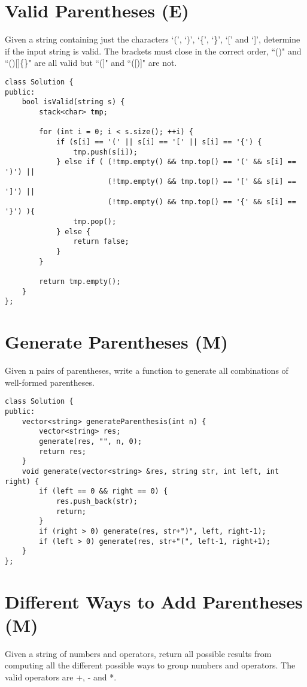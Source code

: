\section{Valid Parentheses (E)}
Given a string containing just the characters `(', `)', `\{', `\}', `[' and `]', determine if the input string is valid. The brackets must close in the correct order, ``()" and ``()[]\{\}" are all valid but ``(]" and ``([)]" are not.\\

\begin{lstlisting}
class Solution {
public:
    bool isValid(string s) {
        stack<char> tmp;
        
        for (int i = 0; i < s.size(); ++i) {
            if (s[i] == '(' || s[i] == '[' || s[i] == '{') {
                tmp.push(s[i]);
            } else if ( (!tmp.empty() && tmp.top() == '(' && s[i] == ')') ||
                        (!tmp.empty() && tmp.top() == '[' && s[i] == ']') ||                                               
                        (!tmp.empty() && tmp.top() == '{' && s[i] == '}') ){
                tmp.pop();
            } else {
                return false;
            }
        }
        
        return tmp.empty();
    }
};
\end{lstlisting}


\section{Generate Parentheses (M)}
Given n pairs of parentheses, write a function to generate all combinations of well-formed parentheses. \\
 
\begin{lstlisting}
class Solution {
public:
    vector<string> generateParenthesis(int n) {
        vector<string> res;
        generate(res, "", n, 0);
        return res;
    }
    void generate(vector<string> &res, string str, int left, int right) {
        if (left == 0 && right == 0) {
            res.push_back(str);
            return;
        }
        if (right > 0) generate(res, str+")", left, right-1);
        if (left > 0) generate(res, str+"(", left-1, right+1);
    }
};
\end{lstlisting}


\section{Different Ways to Add Parentheses (M)}
Given a string of numbers and operators, return all possible results from computing all the different possible ways to group numbers and operators. The valid operators are +, - and *.\\

